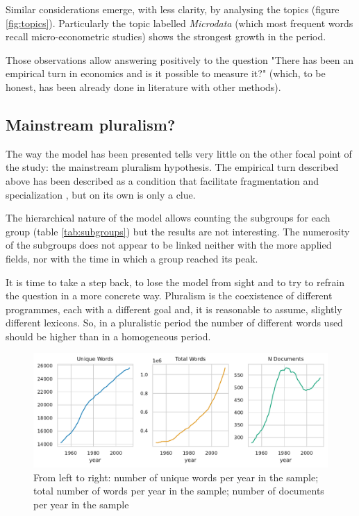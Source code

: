 \documentclass[a4paper, 11pt, headings=standardclasses, tablecaptionsbelow]{scrartcl}
\begin{document}
Similar considerations emerge, with less clarity, by analysing the topics (figure \ref{fig:topics}). Particularly the topic labelled \textit{Microdata} (which most frequent words recall micro-econometric studies) shows the strongest growth in the period.

Those observations allow answering positively to the question "There has been an empirical turn in economics and is it possible to measure it?" (which, to be honest, has been already done in literature with other methods).

\subsection{Mainstream pluralism?}
The way the model has been presented tells very little on the other focal point of the study: the mainstream pluralism hypothesis.
The empirical turn described above has been described as a condition that facilitate fragmentation and specialization \parencite{cedrini2018,backhouse2017}, but on its own is only a clue.



The hierarchical nature of the model allows counting the subgroups for each group (table \ref{tab:subgroups}) but the results are not interesting.
The numerosity of the subgroups does not appear to be linked neither with the more applied fields, nor with the time in which a group reached its peak.

It is time to take a step back, to lose the model from sight and to try to refrain the question in a more concrete way. Pluralism is the coexistence of different programmes, each with a different goal and, it is reasonable to assume, slightly different lexicons. So, in a pluralistic period the number of different words used should be higher than in a homogeneous period.

\begin{figure}[tb]
  \centering
  \includegraphics[width=\textwidth]{src/uwords.pdf}
  \caption[Unique Words]{From left to right: number of unique words per year in the sample; total number of words per year in the sample; number of documents per year in the sample}
  \label{fig:uwords}
\end{figure}
\end{document}
